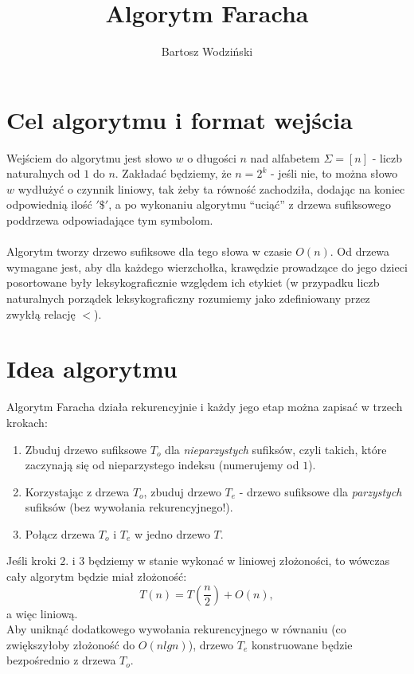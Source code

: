 \documentclass[a4paper,oneside,10pt]{book}
\title{Algorytm Faracha}
\author{Bartosz Wodziński}
\begin{document}
\maketitle
    \section*{Cel algorytmu i format wejścia}
    Wejściem do algorytmu jest słowo $w$ o długości $n$ nad alfabetem $\Sigma = [n]$ - liczb naturalnych od $1$ do $n$. Zakładać będziemy, że $n = 2^k$ - jeśli nie, to można słowo $w$ wydłużyć o czynnik liniowy, tak żeby ta równość zachodziła, dodając na koniec odpowiednią ilość $'\$'$, a po wykonaniu algorytmu ``uciąć'' z drzewa sufiksowego poddrzewa odpowiadające tym symbolom. \\ \\
    Algorytm tworzy drzewo sufiksowe dla tego słowa w czasie $O(n)$. Od drzewa wymagane jest, aby dla każdego wierzchołka, krawędzie prowadzące do jego dzieci posortowane były leksykograficznie względem ich etykiet (w przypadku liczb naturalnych porządek leksykograficzny rozumiemy jako zdefiniowany przez zwykłą relację $<$).
    
    \section*{Idea algorytmu}
    Algorytm Faracha działa rekurencyjnie i każdy jego etap można zapisać w trzech krokach:
    \begin{enumerate}
     \item Zbuduj drzewo sufiksowe $T_o$ dla \textit{nieparzystych} sufiksów, czyli takich, które zaczynają się od nieparzystego indeksu (numerujemy od $1$).
     \item Korzystając z drzewa $T_o$, zbuduj drzewo $T_e$ - drzewo sufiksowe dla \textit{parzystych} sufiksów (bez wywołania rekurencyjnego!).
     \item Połącz drzewa $T_o$ i $T_e$ w jedno drzewo $T$.
    \end{enumerate}
    Jeśli kroki $2.$ i $3$ będziemy w stanie wykonać w liniowej złożoności, to wówczas cały algorytm będzie miał złożoność:
    $$
        T(n) = T\left(\frac{n}{2}\right) + O(n),
    $$
    a więc liniową. \\
    Aby  uniknąć dodatkowego wywołania rekurencyjnego w równaniu (co zwiększyłoby złożoność do $O(nlgn)$), drzewo $T_e$ konstruowane będzie bezpośrednio z drzewa $T_o$.
    
\end{document}
